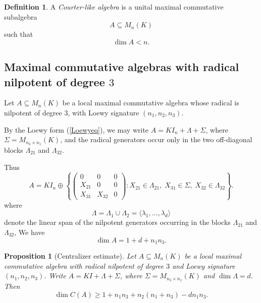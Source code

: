 \documentclass[11pt]{article}
\theoremstyle{remark}
\theoremstyle{plain}
\newtheorem{proposition}[theorem]{Proposition}
\theoremstyle{definition}
\newtheorem{definition}[theorem]{Definition}
\theoremstyle{myremark}
\begin{document}
\begin{definition}
	A \emph{Courter-like algebra} is a unital maximal commutative subalgebra
	\[A\subseteq M_n(K)	\]
	such that
	\[\dim A<n.\]
\end{definition}\medskip


\subsection{Maximal commutative algebras with radical nilpotent of degree \(3\)}

Let \(A\subseteq M_n(K)\) be a local maximal commutative algebra whose
radical is nilpotent of degree \(3\), with Loewy signature
\((n_1,n_2,n_3)\).

By the Loewy form (\ref{Loewyeq}), we may write
\(A=KI_n+\Lambda+\Sigma\), where \(\Sigma=M_{n_3\times n_1}(K)\), and
the radical generators occur only in the two off-diagonal blocks
\(\Lambda_{21}\) and \(\Lambda_{32}\).

Thus
\begin{equation}\label{Supru}
	A=
	KI_n\oplus
	\left\{
	\begin{pmatrix}
		0&0&0\\
		X_{21}&0&0\\
		X_{31}&X_{32}&0
	\end{pmatrix}
	:
	X_{21}\in\Lambda_{21},\;
	X_{31}\in\Sigma,\;
	X_{32}\in\Lambda_{32}
	\right\}.
\end{equation}
where
\[\Lambda= \Lambda_1\cup \Lambda_2=\langle \lambda_1,\dots,\lambda_d\rangle\]
denote the linear span of the nilpotent generators  occurring in the
blocks \(\Lambda_{21}\) and \(\Lambda_{32}\), 
We have
\begin{equation} \label{dim} \dim A=1+d+n_1n_3.\end{equation}




\begin{proposition}[Centralizer estimate]\label{centralizer_estimate_nil3}
	Let \(A\subseteq M_n(K)\) be a local maximal commutative algebra with radical
	nilpotent of degree \(3\) and Loewy signature \((n_1,n_2,n_3)\). Write
	\(A=KI+\Lambda+\Sigma\), where \(\Sigma=M_{n_3\times n_1}(K)\) and
	\(\dim\Lambda=d\). Then
	\[
	\dim C(A)\ge
	1+n_1n_3+n_2(n_1+n_3)-d n_1n_3.
	\]
\end{proposition}
\end{document}
